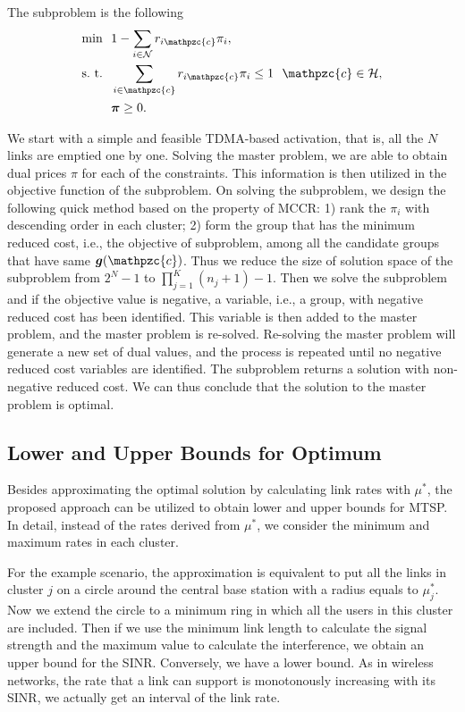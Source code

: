 \documentclass[10pt,onecolumn,journal,draftcls,oneside]{IEEEtran}
\newcounter{exam}
\newcommand{\CN}{\mathcal{N}}
\newcommand{\CH}{\mathcal{H}}
\newcommand{\Cc}{\mathpzc{c}}
\newcommand{\Bg}{\boldsymbol{g}}
\newcommand{\Bpi}{\boldsymbol{\pi}}
\begin{document}
The subproblem is the following 
\begin{subequations}
\label{eq:rc}
\begin{align}
\min~~ &1- \sum_{i \in \CN} r_{i\Cc} \pi_i, \label{eq:rco}\\
\text{s.~t.}~~ & \sum_{i \in \Cc} r_{i\Cc} \pi_i \leq 1~~\Cc \in \CH, \label{eq:rcc} \\
& \Bpi \geq 0.
\end{align}
\end{subequations}

We start with a simple and feasible TDMA-based activation, that is, all the $N$ links are emptied one by one. Solving the master problem, we are able to obtain dual prices $\pi$ for each of the constraints. This information is then utilized in the objective function of the subproblem. On solving the subproblem, we design the following quick method based on the property of MCCR: 1) rank the $\pi_i$ with descending order in each cluster; 2) form the group that has the minimum reduced cost, i.e., the objective of subproblem, among all the candidate groups that have same $\Bg(\Cc)$. Thus we reduce the size of solution space of the subproblem from $2^N-1$ to $\prod_{j=1}^K{(n_j+1)}-1$. Then we solve the subproblem and if the objective value is negative, a variable, i.e., a group, with negative reduced cost has been identified. This variable is then added to the master problem, and the master problem is re-solved. Re-solving the master problem will generate a new set of dual values, and the process is repeated until no negative reduced cost variables are identified. The subproblem returns a solution with non-negative reduced cost. We can thus conclude that the solution to the master problem is optimal.

\subsection{Lower and Upper Bounds for Optimum}
Besides approximating the optimal solution by calculating link rates with $\mu^*$, the proposed approach can be utilized to obtain lower and upper bounds for MTSP. In detail, instead of the rates derived from $\mu^*$, we consider the minimum and maximum rates in each cluster. 

For the example scenario, the approximation is equivalent to put all the links in cluster $j$ on a circle around the central base station with a radius equals to $\mu_j^*$. Now we extend the circle to a minimum ring in which all the users in this cluster are included. Then if we use the minimum link length to calculate the signal strength and the maximum value to calculate the interference, we obtain an upper bound for the SINR. Conversely, we have a lower bound. As in wireless networks, the rate that a link can support is monotonously increasing with its SINR, we actually get an interval of the link rate. 
\end{document}
